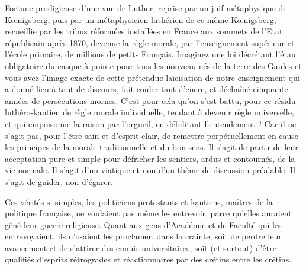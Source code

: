 \documentclass[french,twoside]{book} %
\begin{document}
Fortune prodigieuse d’une vue de Luther, reprise par un juif métaphysique de Kœnigsberg, puis par un métaphysicien luthérien de ce même Kœnigsberg, recueillie par les tribus réformées installées en France aux sommets de l’Etat républicain après 1870, devenue la règle morale, par l’enseignement supérieur et l’école primaire, de millions de petits Français. Imaginez une loi décrétant l’étau obligatoire du casque à pointe pour tous les nouveau-nés de la terre des Gaules et vous avez l’image exacte de cette prétendue laïcisation de notre enseignement qui a donné lieu à tant de discours, fait couler tant d’encre, et déchaîné cinquante années de persécutions mornes. C’est pour cela qu’on s’est battu, pour ce résidu luthéro-kantien de règle morale individuelle, tendant à devenir règle universelle, et qui empoisonne la raison par l’orgueil, en débilitant l’entendement ! Car il ne s’agit pas, pour l’être sain et d’esprit clair, de remettre perpétuellement en cause les principes de la morale traditionnelle et du bon sens. Il s’agit de partir de leur acceptation pure et simple pour défricher les sentiers, ardus et contournés, de la vie normale. Il s’agit d’un viatique et non d’un thème de discussion préalable. Il s’agit de guider, non d’égarer.\par
Ces vérités si simples, les politiciens protestants et kantiens, maîtres de la politique française, ne voulaient pas même les entrevoir, parce qu’elles auraient gêné leur guerre religieuse. Quant aux gens d’Académie et de Faculté qui les entrevoyaient, ils n’osaient les proclamer, dans la crainte, soit de perdre leur avancement et de s’attirer des ennuis universitaires, soit (et surtout) d’être qualifiés d’esprits rétrogrades et réactionnaires par des crétins entre les crétins.\par
\end{document}

